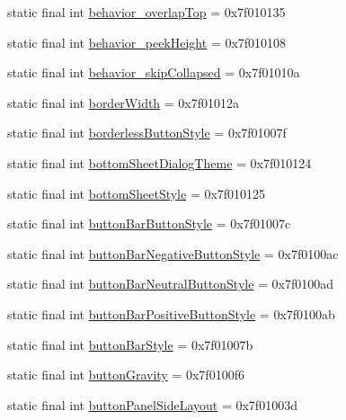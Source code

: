 \begin{CompactItemize}
\item 
static final int \hyperlink{classandroid_1_1support_1_1coreutils_1_1_r_1_1attr_123011d94148cf8cb6383341d2ee128d}{behavior\_\-overlapTop} = 0x7f010135
\item 
static final int \hyperlink{classandroid_1_1support_1_1coreutils_1_1_r_1_1attr_872a8a48a77d6f267635073e38a4a7d9}{behavior\_\-peekHeight} = 0x7f010108
\item 
static final int \hyperlink{classandroid_1_1support_1_1coreutils_1_1_r_1_1attr_e7c271f235bced005cd3ddf2511c40cf}{behavior\_\-skipCollapsed} = 0x7f01010a
\item 
static final int \hyperlink{classandroid_1_1support_1_1coreutils_1_1_r_1_1attr_687489cdf0b89298f28dd7ee480d8b29}{borderWidth} = 0x7f01012a
\item 
static final int \hyperlink{classandroid_1_1support_1_1coreutils_1_1_r_1_1attr_fbd7927eb3ad6d97cae2d7f6d2603923}{borderlessButtonStyle} = 0x7f01007f
\item 
static final int \hyperlink{classandroid_1_1support_1_1coreutils_1_1_r_1_1attr_6e80a19b40960d24b207387a46127e10}{bottomSheetDialogTheme} = 0x7f010124
\item 
static final int \hyperlink{classandroid_1_1support_1_1coreutils_1_1_r_1_1attr_921ead6b05ec8fcf33c42b601264dbd7}{bottomSheetStyle} = 0x7f010125
\item 
static final int \hyperlink{classandroid_1_1support_1_1coreutils_1_1_r_1_1attr_da2947abc3724b47a61944e285ba0904}{buttonBarButtonStyle} = 0x7f01007c
\item 
static final int \hyperlink{classandroid_1_1support_1_1coreutils_1_1_r_1_1attr_034456267790a4a8d4d0e78c4e406a59}{buttonBarNegativeButtonStyle} = 0x7f0100ac
\item 
static final int \hyperlink{classandroid_1_1support_1_1coreutils_1_1_r_1_1attr_6b02280b4e57e1df8d0382afaa2c5010}{buttonBarNeutralButtonStyle} = 0x7f0100ad
\item 
static final int \hyperlink{classandroid_1_1support_1_1coreutils_1_1_r_1_1attr_d52b5f5a49ed8892145ce2ad7b74a78c}{buttonBarPositiveButtonStyle} = 0x7f0100ab
\item 
static final int \hyperlink{classandroid_1_1support_1_1coreutils_1_1_r_1_1attr_1ace7ce2e4446e8bccbbf2d9776b5df8}{buttonBarStyle} = 0x7f01007b
\item 
static final int \hyperlink{classandroid_1_1support_1_1coreutils_1_1_r_1_1attr_da3689a99848fb40b499b7a851395a01}{buttonGravity} = 0x7f0100f6
\item 
static final int \hyperlink{classandroid_1_1support_1_1coreutils_1_1_r_1_1attr_fa4d1493c8a14d38c667801b87ceacee}{buttonPanelSideLayout} = 0x7f01003d

\end{CompactItemize}
